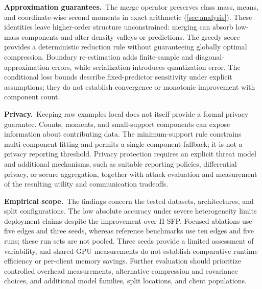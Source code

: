 \noindent\textbf{Approximation guarantees.}~The merge operator preserves class mass, means, and coordinate-wise second moments in exact arithmetic (\cref{sec:analysis}). These identities leave higher-order structure unconstrained: merging can absorb low-mass components and alter density valleys or predictions. The greedy score provides a deterministic reduction rule without guaranteeing globally optimal compression. Boundary re-estimation adds finite-sample and diagonal-approximation errors, while serialization introduces quantization error. The conditional loss bounds describe fixed-predictor sensitivity under explicit assumptions; they do not establish convergence or monotonic improvement with component count.

\noindent\textbf{Privacy.}~Keeping raw examples local does not itself provide a formal privacy guarantee. Counts, moments, and small-support components can expose information about contributing data. The minimum-support rule constrains multi-component fitting and permits a single-component fallback; it is not a privacy reporting threshold. Privacy protection requires an explicit threat model and additional mechanisms, such as suitable reporting policies, differential privacy, or secure aggregation, together with attack evaluation and measurement of the resulting utility and communication tradeoffs.

\noindent\textbf{Empirical scope.}~The findings concern the tested datasets, architectures, and split configurations. The low absolute accuracy under severe heterogeneity limits deployment claims despite the improvement over H-SFP. Focused ablations use five edges and three seeds, whereas reference benchmarks use ten edges and five runs; these run sets are not pooled. Three seeds provide a limited assessment of variability, and shared-GPU measurements do not establish comparative runtime efficiency or per-client memory savings. Further evaluation should prioritize controlled overhead measurements, alternative compression and covariance choices, and additional model families, split locations, and client populations.